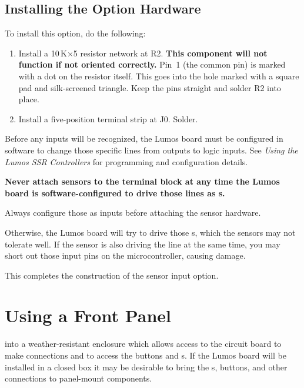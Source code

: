 \documentclass[letterpaper,twoside,onecolumn,openright,final]{memoir}
\begin{document}


\section{Installing the Option Hardware}

To install this option, do the following:
\begin{enumerate}
\item	Install a 10\,K$\times$5 resistor network at R2.  {\bfseries This component will not
	function if not oriented correctly.} Pin~1 (the common pin) is marked with a dot on the 
	resistor itself.  This goes into the hole marked with a square pad and silk-screened 
	triangle.  
	Keep the pins straight and solder R2 into place.
\item	Install a five-position terminal strip at J0.  Solder.
\end{enumerate}

\begin{description}
\item[\HandRight\ Note:] Before any inputs will be recognized, the Lumos board must be configured
in software to change those specific lines from  outputs to logic inputs.  See
\emph{Using the Lumos SSR Controllers} for programming and configuration details.
{\bfseries Never attach sensors to the terminal block at any time the Lumos board is software-configur\-ed
to drive those lines as s.  
\item[\HandRight\ Note:] Always configure those as inputs before attaching the
sensor hardware.} Otherwise, the Lumos board will try to drive those s, which the
sensors may not tolerate well. If the sensor is also driving the line at the same time, you may
short out those input pins on the microcontroller, causing damage.
\end{description}

This completes the construction of the sensor input option.

\chapter{Using a Front Panel}\label{ch:fp}
 into a weather-resistant enclosure which allows access
to the circuit board to make connections and to access the buttons and s.  If the Lumos
board will be installed in a closed box it may be desirable to bring the s, buttons,
and other connections to panel-mount components.
\end{document}

